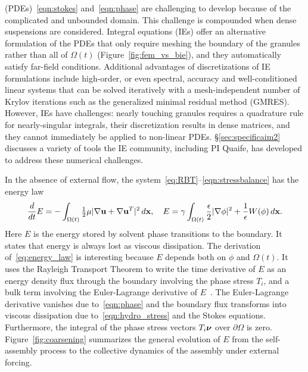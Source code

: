 (PDEs)~\eqref{eqn:stokes} and~\eqref{eqn:phase} are challenging to
develop because of the complicated and unbounded domain. This challenge
is compounded when dense suspensions are considered.
Integral equations
(IEs) offer an alternative formulation of the PDEs that only require
meshing the boundary of the granules rather than all of $\Omega(t)$
(Figure~\ref{fig:fem_vs_bie}), and they automatically satisfy far-field
conditions. Additional advantages of discretizations of IE formulations
include high-order, or even spectral, accuracy and well-conditioned
linear systems that can be solved iteratively with a mesh-independent
number of Krylov iterations such as the generalized minimal residual
method (GMRES). However, IEs have challenges: nearly touching granules
requires a quadrature rule for nearly-singular integrals, their
discretization results in dense matrices, and they cannot immediately be
applied to non-linear PDEs. \S\ref{sec:specificaim2} discusses a variety
of tools the IE community, including PI Quaife, has developed to address
these numerical challenges.

In the absence of external flow, the
system~\eqref{eq:RBT}--\eqref{eqn:stressbalance} has the energy law
\begin{align}
\label{eq:energy_law}
  \frac{d}{dt}E
  = - \int_{\Omega(t)}\tfrac{1}{2}\mu|\nabla \mathbf{u} + \nabla
  \mathbf{u}^T|^2 \,d\mathbf{x},\quad
    E = \gamma \int_{\Omega(t)}
  \frac{\epsilon}{2} |\nabla \phi|^2 + \frac{1}{\epsilon} W(\phi) \,d\mathbf{x}.
\end{align}
Here $E$ is the energy stored by solvent phase transitions to the
boundary. It states that energy is always lost as viscous
dissipation. The derivation of~\eqref{eq:energy_law} is interesting
because $E$ depends both on $\phi$ and $\Omega(t)$. It uses the Rayleigh
Transport Theorem to write the time derivative of $E$ as an energy
density flux through the boundary involving the phase stress $T_i$, and
a bulk term involving the Euler-Lagrange derivative of
$E$~\cite{Fu2018_SIAM}. The Euler-Lagrange derivative vanishes due
to~\eqref{eqn:phase} and the boundary flux transforms into viscous
dissipation due to~\eqref{eqn:hydro_stress} and the Stokes equations.
Furthermore, the integral of the phase stress vectors $T_i\boldsymbol{\nu}$ over
$\partial \Omega$ is zero. Figure~\ref{fig:coarsening} summarizes the
general evolution of $E$ from the self-assembly process to the
collective dynamics of the assembly under external forcing.


